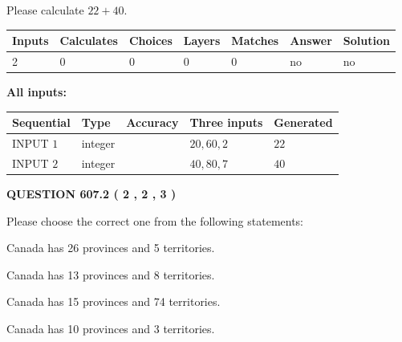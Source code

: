 \documentclass[12pt]{article}
\begin{document}
  
 
Please calculate $ %
22 +  %
40 $.
 
 
   
   
   
   
\noindent\begin{tabular}{|l|l|l|l|l|l|l|}
 \hline
Inputs & Calculates & Choices & Layers & Matches & Answer & Solution \\ \hline
 2  & 
 0  & 
 0
  & 
 0  & 
 0  & 
  no & 
  no 
  \\ \hline
 \end{tabular}
   
   
   
   
\noindent{}
   
   
   
   
\noindent\vspace{0.1in}\hspace{-0.08in} {\textbf{\Large{All inputs: }}}
   
   
  
  
\noindent\begin{tabular}{|l|l|l|l|l|}
\hline
 Sequential & Type & Accuracy & Three inputs & Generated \\ 
\hline
 
 
  INPUT $  1 $ & integer &  & $
 20
 , 
 60
 , 
 2
 $ & $ 22 $ 
 \\  \hline  
 
 
  INPUT $  2 $ & integer &  & $
 40
 , 
 80
 , 
 7
 $ & $ 40 $ 
 \\  \hline  
 \end{tabular}
   
   
  
\vspace{0.2in}
  
{\textbf{\Large{QUESTION
607.2 
 ( 2 , 2 , 3 )
}}}
  
  
Please choose the correct one from the following statements:
 
 
Canada has  26 provinces and  5 territories.
 
 
Canada has  13 provinces and  8 territories.
 
 
Canada has  15 provinces and  74 territories.
 
 
Canada has 10  provinces and 3 territories.
 
\end{document}
